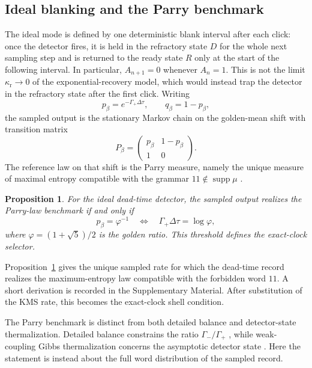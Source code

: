 \documentclass[11pt]{article}
\newtheorem{proposition}[theorem]{Proposition}
\theoremstyle{definition}
\begin{document}
\subsection{Ideal blanking and the Parry benchmark}

The ideal mode is defined by one deterministic blank interval after each click: once the detector fires, it is held in the refractory state $D$ for the whole next sampling step and is returned to the ready state $R$ only at the start of the following interval. In particular, $A_{n+1}=0$ whenever $A_n=1$. This is not the limit $\kappa_{\mathrm r}\to0$ of the exponential-recovery model, which would instead trap the detector in the refractory state after the first click. Writing
\begin{equation}\label{eq:p-beta-main}
p_\beta=e^{-\Gamma_+\Delta\tau}, \qquad q_\beta=1-p_\beta,
\end{equation}
the sampled output is the stationary Markov chain on the golden-mean shift with transition matrix
\begin{equation}\label{eq:golden-mean-main}
P_\beta=
\begin{pmatrix}
 p_\beta & 1-p_\beta \\
 1 & 0
\end{pmatrix}.
\end{equation}
The reference law on that shift is the Parry measure, namely the unique measure of maximal entropy compatible with the grammar $11\notin\operatorname{supp}\mu$ \cite{Parry1964,LindMarcus1995}.

\begin{proposition}\label{prop:ideal-main}
For the ideal dead-time detector, the sampled output realizes the Parry-law benchmark if and only if
\begin{equation}\label{eq:parry-threshold-main}
p_\beta=\varphi^{-1}
\quad\Longleftrightarrow\quad
\Gamma_+\Delta\tau=\log\varphi,
\end{equation}
where $\varphi=(1+\sqrt5)/2$ is the golden ratio. This threshold defines the exact-clock selector.
\end{proposition}

Proposition~\ref{prop:ideal-main} gives the unique sampled rate for which the dead-time record realizes the maximum-entropy law compatible with the forbidden word $11$. A short derivation is recorded in the Supplementary Material. After substitution of the KMS rate, this becomes the exact-clock shell condition.

The Parry benchmark is distinct from both detailed balance and detector-state thermalization. Detailed balance constrains the ratio $\Gamma_-/\Gamma_+$ \cite{Unruh1976,BirDav1982}, while weak-coupling Gibbs thermalization concerns the asymptotic detector state \cite{GarayMartinMartinezRamon2016}. Here the statement is instead about the full word distribution of the sampled record.
\end{document}
